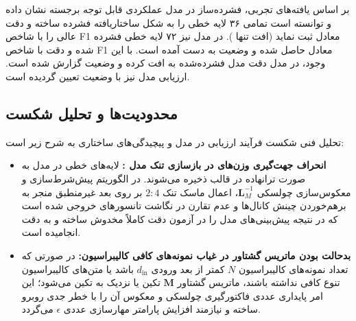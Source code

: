 بر اساس یافته‌های تجربی، فشرده‌ساز  در مدل  عملکردی قابل توجه برجسته نشان داده و توانسته است تمامی ۳۶ لایه خطی را به شکل ساختاریافته فشرده ساخته و دقت عالی  را با شاخص F1 معادل  ثبت نماید (افت تنها ). در مدل  نیز ۷۲ لایه خطی فشرده شده و دقت  با شاخص F1 معادل  حاصل شده و وضعیت  به دست آمده است. با این وجود، در مدل  دقت مدل فشرده‌شده به  افت کرده و وضعیت  گزارش شده است. ارزیابی مدل  نیز با وضعیت  تعیین گردیده است.

\subsection{محدودیت‌ها و تحلیل شکست}
تحلیل فنی شکست فرآیند ارزیابی در مدل  و پیچیدگی‌های ساختاری  به شرح زیر است:
\begin{itemize}
    \item \textbf{انحراف جهت‌گیری وزن‌های  در بازسازی تنک مدل :} لایه‌های خطی در مدل  به صورت ترانهاده در قالب  ذخیره می‌شوند. در الگوریتم پیش‌شرط‌سازی و معکوس‌سازی چولسکی $\mathbf{L}_M^{-1}$، اعمال ماسک تنک $2:4$ بر روی بعد غیرمنطبق منجر به برهم‌خوردن چینش کانال‌ها و عدم تقارن در نگاشت تانسورهای خروجی شده است که در نتیجه پیش‌بینی‌های مدل را در آزمون دقت کاملاً مخدوش ساخته و به دقت  انجامیده است.
    \item \textbf{بدحالت بودن ماتریس گشتاور در غیاب نمونه‌های کافی کالیبراسیون:} در صورتی که تعداد نمونه‌های کالیبراسیون $N$ کمتر از بعد ورودی $d_{\text{in}}$ باشد یا متن‌های کالیبراسیون تنوع کافی نداشته باشند، ماتریس گشتاور $\mathbf{M}$ تکین یا نزدیک به تکین می‌شود؛ این امر پایداری عددی فاکتورگیری چولسکی و معکوس آن را با خطر جدی روبرو ساخته و نیازمند افزایش پارامتر مهارسازی عددی $\epsilon$ می‌گردد.
\end{itemize}
